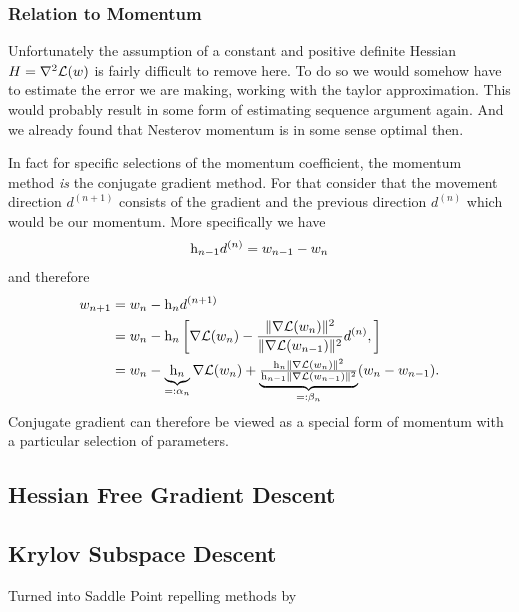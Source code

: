 \subsubsection{Relation to Momentum}

Unfortunately the assumption of a constant and positive definite Hessian
\(H=\nabla^2\mathcal{L}(w)\) is fairly difficult to remove here. To do so
we would somehow have to estimate the error we are making, working with the taylor
approximation. This would probably result in some form of estimating sequence
argument again. And we already found that Nesterov momentum is in some sense
optimal then.

In fact for specific selections of the momentum coefficient, the momentum method
\emph{is} the conjugate gradient method. For that consider that the movement
direction \(d^{(n+1)}\) consists of the gradient and the previous direction
\(d^{(n)}\) which would be our momentum. More specifically we have
\begin{align*}
	\text{h}_{n-1}d^{(n)} = w_{n-1} - w_n
\end{align*}
and therefore
\begin{align*}
	w_{n+1}
	&= w_n - \text{h}_n d^{(n+1)}\\
	&= w_n - \text{h}_n \left[
		\nabla\mathcal{L}(w_n)
		- \frac{\|\nabla\mathcal{L}(w_n)\|^2}{\|\nabla\mathcal{L}(w_{n-1})\|^2}
		d^{(n)},
	\right]\\
	&= w_n - \underbrace{\text{h}_n}_{=:\alpha_n} \nabla\mathcal{L}(w_n)
		+ \underbrace{\tfrac{\text{h}_n\|\nabla\mathcal{L}(w_n)\|^2}{\text{h}_{n-1}\|\nabla\mathcal{L}(w_{n-1})\|^2}}_{=:\beta_n}
		(w_n-w_{n-1}).
\end{align*}
Conjugate gradient can therefore be viewed as a special form of momentum with
a particular selection of parameters.

\subsection{Hessian Free Gradient Descent}
\textcite{martensDeepLearningHessianfree2010}

\subsection{Krylov Subspace Descent}

\textcite{vinyalsKrylovSubspaceDescent2012}

Turned into Saddle Point repelling methods by \textcite{dauphinIdentifyingAttackingSaddle2014}

